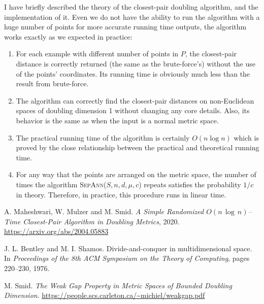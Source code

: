 \documentclass[12pt,english,]{article}
\providecommand{\tightlist}{%
  \setlength{\itemsep}{0pt}\setlength{\parskip}{0pt}}
\begin{document}
I have briefly described the theory of the closest-pair doubling
algorithm, and the implementation of it. Even we do not have the ability
to run the algorithm with a huge number of points for more accurate
running time outputs, the algorithm works exactly as we expected in
practice:

\begin{enumerate}
\def\labelenumi{\arabic{enumi}.}
\tightlist
\item
  For each example with different number of points in \(P\), the
  closest-pair distance is correctly returned (the same as the
  brute-force's) without the use of the points' coordinates. Its running
  time is obviously much less than the result from brute-force.
\item
  The algorithm can correctly find the closest-pair distances on
  non-Euclidean spaces of doubling dimension 1 without changing any core
  details. Also, its behavior is the same as when the input is a normal
  metric space.
\item
  The practical running time of the algorithm is certainly
  \(O(n\log n)\) which is proved by the close relationship between the
  practical and theoretical running time.
\item
  For any way that the points are arranged on the metric space, the
  number of times the algorithm \textsc{SepAnn($S,n,d,\mu,c$)} repeats
  satisfies the probability \(1/c\) in theory. Therefore, in practice,
  this procedure runs in linear time.
\end{enumerate}

\newpage

\begin{thebibliography}{9}
A. Maheshwari, W. Mulzer and M. Smid. \emph{A Simple Randomized $O(n\,\log\,n)$–Time Closest-Pair Algorithm in Doubling Metrics}, 2020. \url{https://arxiv.org/abs/2004.05883}

J. L. Bentley and M. I. Shamos. Divide-and-conquer in multidimensional space. In \emph{Proceedings of the 8th ACM Symposium on the Theory of Computing}, pages 220–230,
1976.

M. Smid. \emph{The Weak Gap Property in Metric Spaces of Bounded Doubling Dimension}. \url{https://people.scs.carleton.ca/~michiel/weakgap.pdf}

\end{thebibliography}
\end{document}

